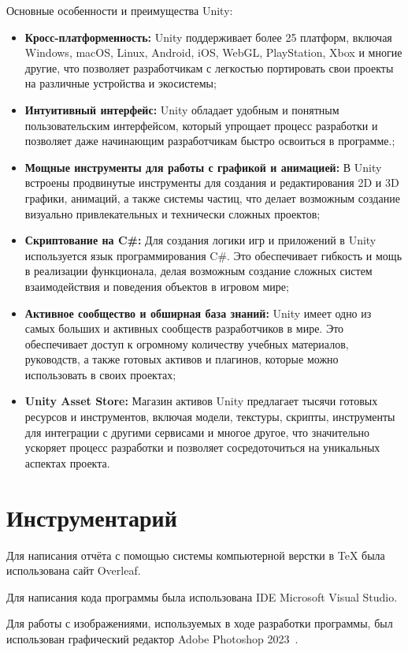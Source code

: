 Основные особенности и преимущества Unity:
\begin{itemize}
    \item \textbf{Кросс-платформенность:} Unity поддерживает более 25 платформ, включая Windows, macOS, Linux, Android, iOS, WebGL, PlayStation, Xbox и многие другие, что позволяет разработчикам с легкостью портировать свои проекты на различные устройства и экосистемы;
    \item \textbf{Интуитивный интерфейс:} Unity обладает удобным и понятным пользовательским интерфейсом, который упрощает процесс разработки и позволяет даже начинающим разработчикам быстро освоиться в программе.;
    \item \textbf{Мощные инструменты для работы с графикой и анимацией:} В Unity встроены продвинутые инструменты для создания и редактирования 2D и 3D графики, анимаций, а также системы частиц, что делает возможным создание визуально привлекательных и технически сложных проектов;
    \item \textbf{Скриптование на C\#:} Для создания логики игр и приложений в Unity используется язык программирования C\#. Это обеспечивает гибкость и мощь в реализации функционала, делая возможным создание сложных систем взаимодействия и поведения объектов в игровом мире;
    \item \textbf{Активное сообщество и обширная база знаний:} Unity имеет одно из самых больших и активных сообществ разработчиков в мире. Это обеспечивает доступ к огромному количеству учебных материалов, руководств, а также готовых активов и плагинов, которые можно использовать в своих проектах;
    \item \textbf{Unity Asset Store:} Магазин активов Unity предлагает тысячи готовых ресурсов и инструментов, включая модели, текстуры, скрипты, инструменты для интеграции с другими сервисами и многое другое, что значительно ускоряет процесс разработки и позволяет сосредоточиться на уникальных аспектах проекта.
\end{itemize}


\section{\label{sec:ch01/sec03}Инструментарий}
Для написания отчёта с помощью системы компьютерной верстки в \TeX{} была использована сайт Overleaf.

Для написания кода программы была использована IDE Microsoft Visual Studio.

Для работы с изображениями, используемых в ходе разработки программы, был использован графический редактор Adobe Photoshop 2023~\cite{photoshop}.

